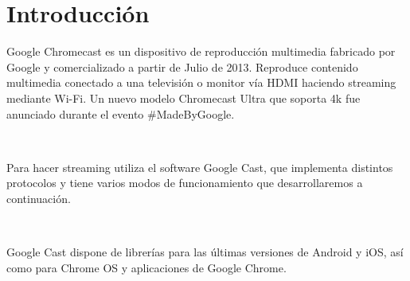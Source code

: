 \section{Introducción}
Google Chromecast es un dispositivo de reproducción multimedia fabricado por Google y comercializado a partir de Julio de 2013. Reproduce contenido multimedia conectado a una televisión o monitor vía HDMI haciendo streaming mediante Wi-Fi. Un nuevo modelo Chromecast Ultra que soporta 4k fue anunciado durante el evento \#MadeByGoogle.

\

Para hacer streaming utiliza el software Google Cast, que implementa distintos protocolos y tiene varios modos de funcionamiento que desarrollaremos a continuación.

\

Google Cast dispone de librerías para las últimas versiones de Android y iOS, así como para Chrome OS y aplicaciones de Google Chrome.

